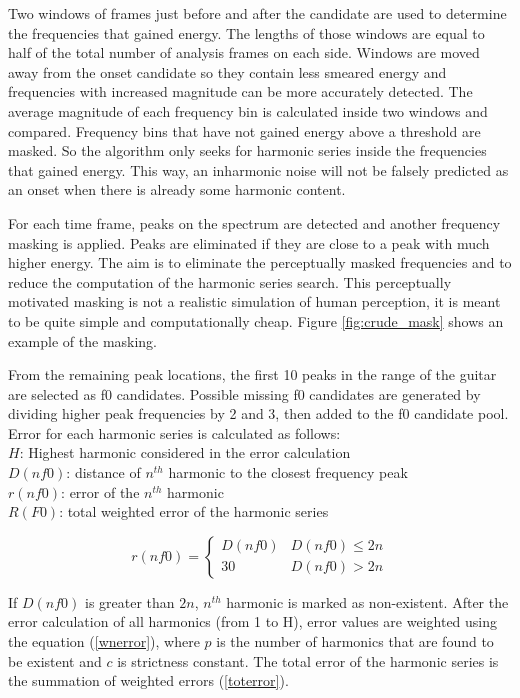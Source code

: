 Two windows of frames just before and after the candidate are used to determine the frequencies that gained energy. The lengths of those windows are equal to half of the total number of analysis frames on each side. Windows are moved away from the onset candidate so they contain less smeared energy and frequencies with increased magnitude can be more accurately detected. The average magnitude of each frequency bin is calculated inside two windows and compared. Frequency bins that have not gained energy above a threshold are masked. So the algorithm only seeks for harmonic series inside the frequencies that gained energy. This way, an inharmonic noise will not be falsely predicted as an onset when there is already some harmonic content.

For each time frame, peaks on the spectrum are detected and another frequency masking is applied. Peaks are eliminated if they are close to a peak with much higher energy. The aim is to eliminate the perceptually masked frequencies and to reduce the computation of the harmonic series search. This perceptually motivated masking is not a realistic simulation of human perception, it is meant to be quite simple and computationally cheap. Figure \ref{fig:crude_mask} shows an example of the masking. 

From the remaining peak locations, the first 10 peaks in the range of the guitar are selected as f0 candidates. Possible missing f0 candidates are generated by dividing higher peak frequencies by 2 and 3, then added to the f0 candidate pool. Error for each harmonic series is calculated as follows:\\
$H$: Highest harmonic considered in the error calculation \\
\(D(nf0)\): distance of $n^{th}$ harmonic to the closest frequency peak \\
\(r(nf0)\): error of the $n^{th}$ harmonic \\
\(R(F0)\): total weighted error of the harmonic series

\begin{equation}\label{nerror}
    r(nf0)= \begin{cases} 
          D(nf0) & D(nf0)\leq 2n \\
          30 & D(nf0) > 2n 
          \end{cases}
\end{equation}  

If $D(nf0)$ is greater than $2n$, $n^{th}$ harmonic is marked as non-existent. After the error calculation of all harmonics (from 1 to H), error values are weighted using the equation (\ref{wnerror}), where $p$ is the number of harmonics that are found to be existent and $c$ is strictness constant. The total error of the harmonic series is the summation of weighted errors (\ref{toterror}). \

